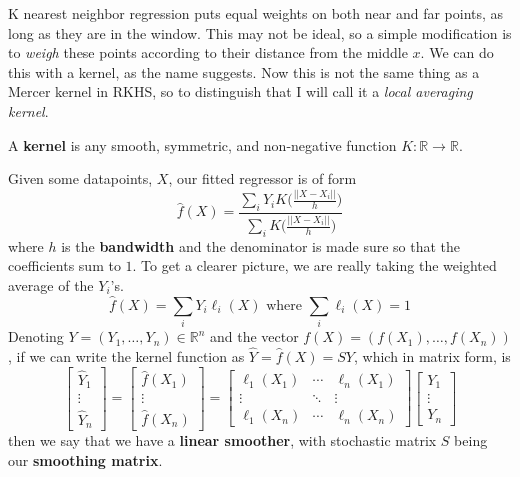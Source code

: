 \documentclass{article}
\begin{document}
  K nearest neighbor regression puts equal weights on both near and far points, as long as they are in the window. This may not be ideal, so a simple modification is to \textit{weigh} these points according to their distance from the middle $x$. We can do this with a kernel, as the name suggests. Now this is not the same thing as a Mercer kernel in RKHS, so to distinguish that I will call it a \textit{local averaging kernel}. 

  \begin{definition}
    A \textbf{kernel} is any smooth, symmetric, and non-negative function $K : \mathbb{R} \to \mathbb{R}$.  
  \end{definition}

  \begin{definition}
    Given some datapoints, $X$, our fitted regressor is of form 
    \begin{equation}
      \hat{f} (X) = \frac{\sum_{i} Y_i K \bigg( \frac{||X - X_i||}{h} \bigg)}{\sum_{i} K \bigg( \frac{||X - X_i||}{h} \bigg)}
    \end{equation}
    where $h$ is the \textbf{bandwidth} and the denominator is made sure so that the coefficients sum to $1$. To get a clearer picture, we are really taking the weighted average of the $Y_i$'s. 
    \begin{equation}
      \hat{f} (X) = \sum_{i} Y_i \ell_i (X) \text{ where } \sum_{i} \ell_i (X) = 1
    \end{equation}
    Denoting $Y = (Y_1, \ldots, Y_n) \in \mathbb{R}^n$ and the vector $f(X) = (f(X_1), \ldots, f(X_n))$, if we can write the kernel function as $\hat{Y} = \hat{f}(X) = S Y$, which in matrix form, is 
    \begin{equation}
      \begin{bmatrix} \hat{Y}_1 \\ \vdots \\ \hat{Y}_n \end{bmatrix} = \begin{bmatrix} \hat{f}(X_1) \\ \vdots \\ \hat{f} (X_n) \end{bmatrix} = \begin{bmatrix} \ell_1 (X_1) & \cdots & \ell_n (X_1) \\ \vdots & \ddots & \vdots \\ \ell_1 (X_n) & \cdots & \ell_n (X_n) \end{bmatrix} \begin{bmatrix} Y_1 \\ \vdots \\ Y_n \end{bmatrix} 
    \end{equation}
    then we say that we have a \textbf{linear smoother}, with stochastic matrix $S$ being our \textbf{smoothing matrix}. 
  \end{definition}
\end{document}
